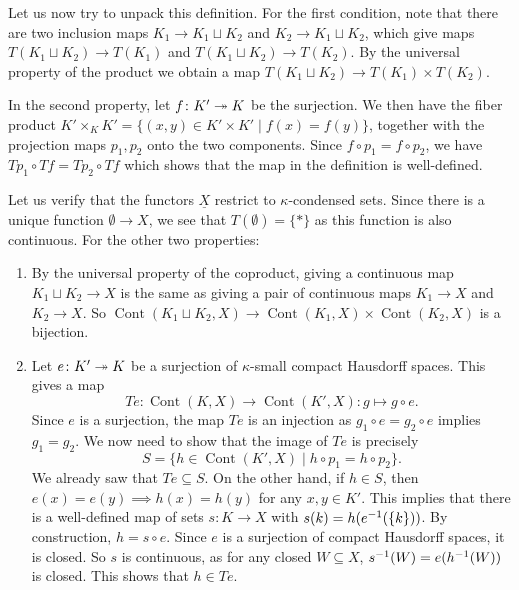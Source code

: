 \documentclass{article}
\DeclareMathOperator{\Cont}{Cont}
\begin{document}
Let us now try to unpack this definition.
For the first condition, note that there are two inclusion maps
$K_1 \to K_1 \sqcup K_2$ and $K_2 \to K_1 \sqcup K_2$, which give
maps $T(K_1 \sqcup K_2) \to T(K_1)$ and $T(K_1 \sqcup K_2) \to T(K_2)$.
By the universal property of the product we obtain a map
$T(K_1 \sqcup K_2) \to T(K_1) \times T(K_2)$.

In the second property, let $f\colon K' \twoheadrightarrow K$ be the surjection.
We then have the fiber product $K' \times_K K' = \{(x,y)\in K' \times K' \mid f(x) = f(y)\}$,
together with the projection maps $p_1, p_2$ onto the two components.
Since $f\circ p_1 = f \circ p_2$, we have $Tp_1 \circ Tf = Tp_2 \circ Tf$
which shows that the map in the definition is well-defined.

Let us verify that the functors $\underline{X}$ restrict
to $\kappa$-condensed sets. Since there is a unique function
$\emptyset \to X$, we see that $T(\emptyset) = \{*\}$ as this function
is also continuous. For the other two properties:
\begin{enumerate}
    \item By the universal property of the coproduct, giving
          a continuous map $K_1 \sqcup K_2 \to X$ is the same as giving
          a pair of
          continuous maps $K_1 \to X$ and $K_2 \to X$.
          So $\Cont(K_1 \sqcup K_2, X) \to \Cont(K_1, X) \times \Cont(K_2, X)$
          is a bijection.
    \item Let $e\colon K' \twoheadrightarrow K$ be a surjection of $\kappa$-small
          compact Hausdorff spaces. This gives a map
          \begin{equation*}
              Te \colon \Cont(K, X) \to \Cont(K', X) \colon g \mapsto g\circ e.
          \end{equation*}
          Since $e$ is a surjection, the map $Te$ is an injection as
          $g_1\circ e = g_2 \circ e$ implies $g_1 = g_2$. We now need
          to show that the image of $Te$ is precisely
          \begin{equation*}
              S = \{h \in \Cont(K' , X) \mid h\circ p_1 = h\circ p_2\}.
          \end{equation*}
          We already saw that $Te \subseteq S$. On the other hand,
          if $h \in S$, then $e(x) = e(y) \implies h(x) = h(y)$ for
          any $x,y\in K'$. This implies that there is a well-defined
          map of sets $s\colon K \to X$ with $s(k) = h(e^{-1}(\{k\}))$.
          By construction, $h = s\circ e$. Since $e$ is a surjection
          of compact Hausdorff spaces, it is closed. So $s$ is continuous,
          as for any closed $W \subseteq X$, $s^{-1}(W) = e(h^{-1}(W))$
          is closed. This shows that $h\in Te$.
\end{enumerate}
\end{document}
